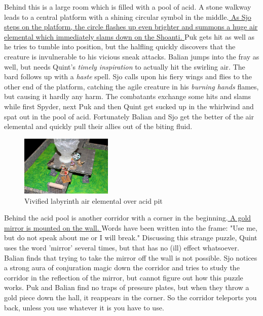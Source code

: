 Behind this is a large room which is filled with a pool of acid. A stone walkway leads to a central platform with a shining circular symbol in the middle.\hyperref[fig:Vivified-labyrinth-air-elemental-over-acid-pit-563931191]{ As Sjo steps on the platform, the circle flashes up even brighter and summons a huge air elemental which immediately slams down on the Shoanti. } Puk gets hit as well as he tries to tumble into position, but the halfling quickly discovers that the creature is invulnerable to his vicious sneak attacks. Balian jumps into the fray as well, but needs Quint's  {\itshape timely inspiration} to actually hit the swirling air. The bard follows up with a  {\itshape haste} spell. Sjo calls upon his fiery wings and flies to the other end of the platform, catching the agile creature in his  {\itshape burning hands} flames, but causing it hardly any harm. The combatants exchange some hits and slams while first Spyder, next Puk and then Quint get sucked up in the whirlwind and spat out in the pool of acid. Fortunately Balian and Sjo get the better of the air elemental and quickly pull their allies out of the biting fluid. \\

\begin{figure}[h]
	\centering
	\includegraphics[width=0.39\textwidth]{images/Vivified-labyrinth-air-elemental-over-acid-pit-563931191.jpg}
	\caption{Vivified labyrinth air elemental over acid pit}
	\label{fig:Vivified-labyrinth-air-elemental-over-acid-pit-563931191}
\end{figure}

Behind the acid pool is another corridor with a corner in the beginning.\hyperref[fig:Vivified-labyrinth-gold-mirror-puzzle-563931764]{ A gold mirror is mounted on the wall. } Words have been written into the frame: "Use me, but do not speak about me or I will break." Discussing this strange puzzle, Quint uses the word 'mirror' several times, but that has no (ill) effect whatsoever. Balian finds that trying to take the mirror off the wall is not possible. Sjo notices a strong aura of conjuration magic down the corridor and tries to study the corridor in the reflection of the mirror, but cannot figure out how this puzzle works. Puk and Balian find no traps of pressure plates, but when they throw a gold piece down the hall, it reappears in the corner. So the corridor teleports you back, unless you use whatever it is you have to use. \\

